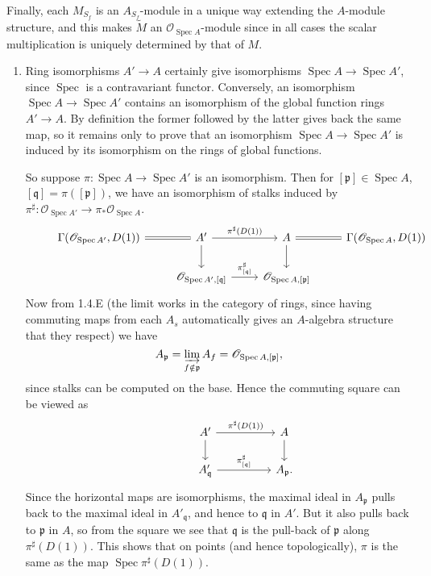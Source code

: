\documentclass{report}
\newcommand{\shMod}[1]{\widetilde{#1}} %
\newcommand{\colimit}{\varinjlim} %
\newcommand{\p}{\mathfrak{p}}
\newcommand{\q}{\mathfrak{q}}
\renewcommand{\O}{\mathscr{O}} %
\DeclareMathOperator{\Spec}{Spec}
\begin{document}
\begin{enumerate}[label=\textbf{4.1.\Alph*.}]
	      Finally, each $M_{S_f}$ is an $A_{S_f}$-module in a unique way extending
	      the $A$-module structure, and this makes $\shMod M$ an
	      $\O_{\Spec A}$-module since in all cases the scalar multiplication is
	      uniquely determined by that of $M$.
\end{enumerate}

\begin{enumerate}[label=\textbf{4.3.\Alph*.}]
	\item Ring isomorphisms $A'\to A$ certainly give isomorphisms
	      $\Spec A\to\Spec A'$, since $\Spec$ is a contravariant functor.
	      Conversely, an isomorphism $\Spec A\to\Spec A'$ contains an isomorphism
	      of the global function rings $A'\to A$. By definition the former
	      followed by the latter gives back the same map, so it remains only to
	      prove that an isomorphism $\Spec A\to\Spec A'$ is induced by its
	      isomorphism on the rings of global functions.

	      So suppose $\pi:\Spec A\to\Spec A'$ is an isomorphism. Then for
	      $[\p]\in\Spec A$, $[\q]=\pi([\p])$, we have an isomorphism of stalks
	      induced by $\pi^\sharp:\O_{\Spec A'}\to\pi_*\O_{\Spec A}$.
	      \begin{equation*}
		      \begin{tikzcd}
			      &\Gamma(\O_{\Spec A'},D(1)) \arrow[equal]{r}
			      &A' \arrow{r}{\pi^\sharp(D(1))} \arrow{d}
			      &A \arrow{d}
			      &\Gamma(\O_{\Spec A},D(1)) \arrow[equal]{l} \\
			      &
			      &\O_{\Spec A',[\q]} \arrow{r}{\pi^\sharp_{[\q]}}
			      &\O_{\Spec A,[\p]}
			      &
		      \end{tikzcd}
	      \end{equation*}
	      Now from 1.4.E (the limit works in the category of rings, since having
	      commuting maps from each $A_s$ automatically gives an $A$-algebra
	      structure that they respect) we have
	      \begin{equation*}
		      A_{\p}=\colimit_{f\notin\p}A_f=\O_{\Spec A,[\p]},
	      \end{equation*}
	      since stalks can be computed on the base. Hence the commuting square can
	      be viewed as
	      \begin{equation*}
		      \begin{tikzcd}[column sep=huge]
			      &A' \arrow{r}{\pi^\sharp(D(1))} \arrow{d}
			      &A \arrow{d} \\
			      &A'_\q \arrow{r}{\pi^\sharp_{[\q]}}
			      &A_\p.
		      \end{tikzcd}
	      \end{equation*}
	      Since the horizontal maps are isomorphisms, the maximal ideal in $A_\p$
	      pulls back to the maximal ideal in $A'_\q$, and hence to $\q$ in $A'$.
	      But it also pulls back to $\p$ in $A$, so from the square we see that
	      $\q$ is the pull-back of $\p$ along $\pi^\sharp(D(1))$. This shows that
	      on points (and hence topologically), $\pi$ is the same as the map
	      $\Spec\pi^\sharp(D(1))$.


\end{enumerate}
\end{document}
